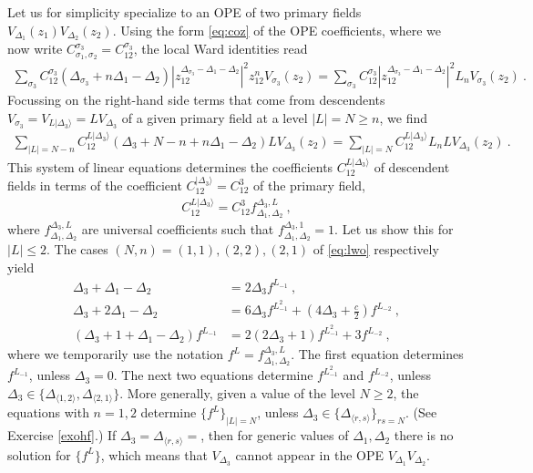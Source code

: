 \documentclass[12pt, a4paper, notitlepage, twoside]{report}
\numberwithin{equation}{section}
\theoremstyle{break}
\begin{document}
Let us for simplicity specialize to an OPE of two primary fields $V_{\Delta_1}(z_1)V_{\Delta_2}(z_2)$. Using the form \eqref{eq:coz} of the OPE coefficients, where we now write $C^{\sigma_3}_{\sigma_1,\sigma_2}=C^{\sigma_3}_{12}$,
the local Ward identities read 
\begin{align}
 \sum_{\sigma_3} C^{\sigma_3}_{12}(\Delta_{\sigma_3} + n\Delta_1-\Delta_2) 
 \left| z_{12}^{\Delta_{{\sigma_3}}-\Delta_1-\Delta_2}\right|^2 z_{12}^n V_{\sigma_3}(z_2) 
 = 
 \sum_{\sigma_3} C^{\sigma_3}_{12} 
 \left| z_{12}^{\Delta_{{\sigma_3}}-\Delta_1-\Delta_2} \right|^2 L_nV_{\sigma_3}(z_2)\ .
\end{align}
Focussing on the right-hand side terms that come from descendents $V_{\sigma_3}= V_{L|\Delta_3\rangle}= LV_{\Delta_3}$ of a given primary field at a level $|L|=N\geq n$, we find
\begin{align}
 \sum_{|L|=N-n} C^{L|\Delta_3\rangle}_{12}(\Delta_3+N-n+n\Delta_1-\Delta_2)L V_{\Delta_3}(z_2)
 = 
 \sum_{|L|=N} C^{L|\Delta_3\rangle}_{12}L_nL V_{\Delta_3}(z_2)\ .
 \label{eq:lwo}
\end{align}
This system of linear equations determines the coefficients $C^{L|\Delta_3\rangle}_{12}$ of descendent fields in terms of the coefficient $C^{|\Delta_3\rangle}_{12}=C^3_{12}$ of the primary field,
\begin{align}
 C^{L|\Delta_3\rangle}_{12} 
 = 
 C^{3}_{12} f^{\Delta_3,L}_{\Delta_1,\Delta_2}\ ,
\end{align}
where  $f^{\Delta_3,L}_{\Delta_1,\Delta_2}$ are universal coefficients such that $f^{\Delta_3,1}_{\Delta_1,\Delta_2} =1$.
Let us show this for $|L|\leq 2$. The cases $(N,n)=(1,1),(2,2),(2,1)$ of \eqref{eq:lwo} respectively yield 
\begin{align}
 \Delta_3 + \Delta_1-\Delta_2 & = 2\Delta_3 f^{L_{-1}} \ ,
 \label{flfo}
 \\
 \Delta_3+ 2\Delta_1-\Delta_2 & = 6\Delta_3 f^{L_{-1}^2} + (4\Delta_3+\tfrac{c}{2})f^{L_{-2}}\ ,
 \\
 (\Delta_3+1+\Delta_1-\Delta_2) f^{L_{-1}} & = 2(2\Delta_3+1) f^{L_{-1}^2} + 3 f^{L_{-2}}\ ,
 \label{flff}
\end{align}
where we temporarily use the notation $f^L=f^{\Delta_3,L}_{\Delta_1,\Delta_2}$.
The first equation determines $f^{L_{-1}}$, unless $\Delta_3=0$. The next two equations determine
$f^{L_{-1}^2}$ and $f^{L_{-2}}$, unless $\Delta_3 \in \{\Delta_{\langle 1,2 \rangle}, \Delta_{\langle 2,1 \rangle}\}$.
More generally, given a value of the level $N\geq 2$, the equations with $n=1,2$ determine $\{f^L\}_{|L|=N}$, unless $\Delta_3\in\{\Delta_{\langle r,s \rangle}\}_{rs=N}$. (See Exercise \ref{exohf}.) If $\Delta_3=\Delta_{\langle r,s \rangle}=$, then for generic values of $\Delta_1,\Delta_2$ there is no solution for $\{f^L\}$, which means that $V_{\Delta_3}$ cannot appear in the OPE $V_{\Delta_1}V_{\Delta_2}$.
\end{document}
